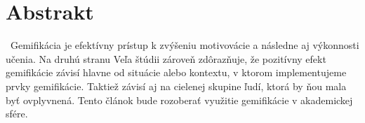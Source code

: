 \section{Abstrakt}\label{abstrakt}
\indent~Gemifikácia je efektívny prístup k zvýšeniu motivovácie a následne aj výkonnosti
učenia. Na druhú stranu Veľa štúdii zároveň zdôrazňuje, že pozitívny efekt gemifikácie
závisí hlavne od situácie alebo kontextu, v ktorom implementujeme prvky gemifikácie. 
Taktiež závisí aj na cielenej skupine ľudí, ktorá by ňou mala byť ovplyvnená.
Tento článok bude rozoberať využitie gemifikácie v akademickej sfére.